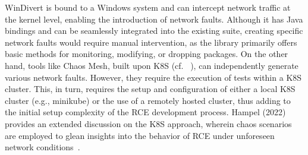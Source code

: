 WinDivert is bound to a Windows system and can intercept network traffic at the kernel level, enabling the introduction of network faults. Although it has Java bindings and can be seamlessly integrated into the existing suite, creating specific network faults would require manual intervention, as the library primarily offers basic methods for monitoring, modifying, or dropping packages. On the other hand, tools like Chaos Mesh, built upon \ac{K8S} (cf. ~), can independently generate various network faults. However, they require the execution of tests within a \ac{K8S} cluster. This, in turn, requires the setup and configuration of either a local \ac{K8S} cluster (e.g., minikube) or the use of a remotely hosted cluster, thus adding to the initial setup complexity of the \ac{RCE} development process. Hampel (2022) provides an extended discussion on the \ac{K8S} approach, wherein chaos scenarios are employed to glean insights into the behavior of \ac{RCE} under unforeseen network conditions~\cite{Hampel2022}.

